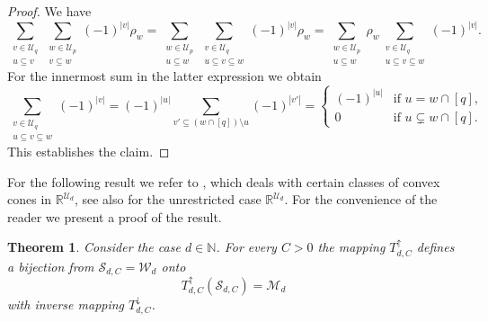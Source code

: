 \documentclass{article}
\newcommand{\R}  {{\mathbb R}}
\newcommand{\N}  {{\mathbb N}}
\newcommand{\U}  {\mathcal{U}}
\newcommand{\W}  {\mathcal{W}}
\newcommand{\M}  {\mathcal{M}}
\newcommand{\SSS}{\mathcal{S}}
\newcommand{\lo}{\downarrow}
\newcommand{\up}{\uparrow}
\theoremstyle{plain}
\newtheorem{theo}{Theorem}
\theoremstyle{definition}
\begin{document}
\begin{proof}
We have 
\[
\sum_{\substack{v\in \U_q \\ u \subseteq v}} 
\sum_{\substack{w\in \U_p \\ v \subseteq w}}
(-1)^{|v|} \rho_w 
=
\sum_{\substack{w\in \U_p \\ u \subseteq w}}
\sum_{\substack{v\in \U_q \\ u \subseteq v \subseteq w}}
(-1)^{|v|} \rho_w 
=
\sum_{\substack{w\in \U_p \\ u \subseteq w}}
\rho_w
\sum_{\substack{v\in\U_q\\ u \subseteq v \subseteq w}} 
(-1)^{|v|}.
\]
For the innermost sum in the latter expression we obtain
\[
 \sum_{\substack{v\in\U_q\\ 
                 u \subseteq v \subseteq w }} 
(-1)^{|v|}
= (-1)^{|u|} \sum_{v' \subseteq (w \cap [q])\setminus u} (-1)^{|v'|}=
\begin{cases}
(-1)^{|u|} &\text{if $u = w \cap [q]$},\\
0 &\text{if $u \subsetneq w \cap [q]$.}
\end{cases}
\]
This establishes the claim.
\end{proof}

For the following result we refer to 
\citet[Lem.~1]{Matus94}, which deals with certain 
classes of convex cones in $\R^{\U_d}$, see also
\citet[4.18 and 4.19.(ii)]{Aigner79} for the unrestricted case
$\R^{\U_d}$.
For the convenience of the reader we present a proof of the result.

\begin{theo}\label{t1a}
Consider the case $d \in \N$. 
For every $C > 0$ the mapping $T^\up_{d,C}$ defines 
a bijection from $\SSS_{d,C}=\W_d$ onto 
\[
T^\up_{d,C}(\SSS_{d,C}) = \M_d
\]
with inverse mapping $T^\lo_{d,C}$.
\end{theo}
\end{document}
